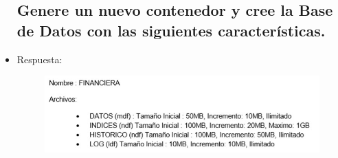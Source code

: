\begin{itemize}
		\subsection{Genere un nuevo contenedor y cree la Base de Datos con las siguientes características.}
			\item Respuesta:
				\begin{figure}[htb]
					\begin{center}
						\includegraphics[width=16cm]{./Imagenes/Generar}
					\end{center}
				\end{figure}
		
	\end{itemize}